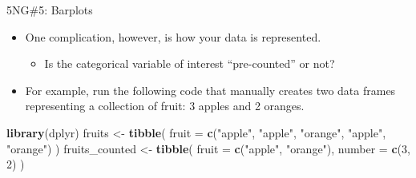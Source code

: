 \documentclass[
  ignorenonframetext,
]{beamer}
\newenvironment{Shaded}{\begin{snugshade}}{\end{snugshade}}
\newcommand{\AttributeTok}[1]{\textcolor[rgb]{0.13,0.29,0.53}{#1}}
\newcommand{\DecValTok}[1]{\textcolor[rgb]{0.00,0.00,0.81}{#1}}
\newcommand{\FunctionTok}[1]{\textcolor[rgb]{0.13,0.29,0.53}{\textbf{#1}}}
\newcommand{\NormalTok}[1]{#1}
\newcommand{\OtherTok}[1]{\textcolor[rgb]{0.56,0.35,0.01}{#1}}
\newcommand{\StringTok}[1]{\textcolor[rgb]{0.31,0.60,0.02}{#1}}
\providecommand{\tightlist}{%
  \setlength{\itemsep}{0pt}\setlength{\parskip}{0pt}}
\begin{document}
\begin{frame}[fragile]{5NG\#5: Barplots}
\label{ng5-barplots-1}
\begin{itemize}
\item
  One complication, however, is how your data is represented.

  \begin{itemize}
  \tightlist
  \item
    Is the categorical variable of interest ``pre-counted'' or not?
  \end{itemize}
\item
  For example, run the following code that manually creates two data
  frames representing a collection of fruit: 3 apples and 2 oranges.
\end{itemize}

\tiny

\begin{Shaded}
\begin{Highlighting}[]
\FunctionTok{library}\NormalTok{(dplyr)}
\NormalTok{fruits }\OtherTok{\textless{}{-}} \FunctionTok{tibble}\NormalTok{(}
  \AttributeTok{fruit =} \FunctionTok{c}\NormalTok{(}\StringTok{"apple"}\NormalTok{, }\StringTok{"apple"}\NormalTok{, }\StringTok{"orange"}\NormalTok{, }\StringTok{"apple"}\NormalTok{, }\StringTok{"orange"}\NormalTok{)}
\NormalTok{)}
\NormalTok{fruits\_counted }\OtherTok{\textless{}{-}} \FunctionTok{tibble}\NormalTok{(}
  \AttributeTok{fruit =} \FunctionTok{c}\NormalTok{(}\StringTok{"apple"}\NormalTok{, }\StringTok{"orange"}\NormalTok{),}
  \AttributeTok{number =} \FunctionTok{c}\NormalTok{(}\DecValTok{3}\NormalTok{, }\DecValTok{2}\NormalTok{)}
\NormalTok{)}
\end{Highlighting}
\end{Shaded}

\normalsize
\end{frame}
\end{document}

